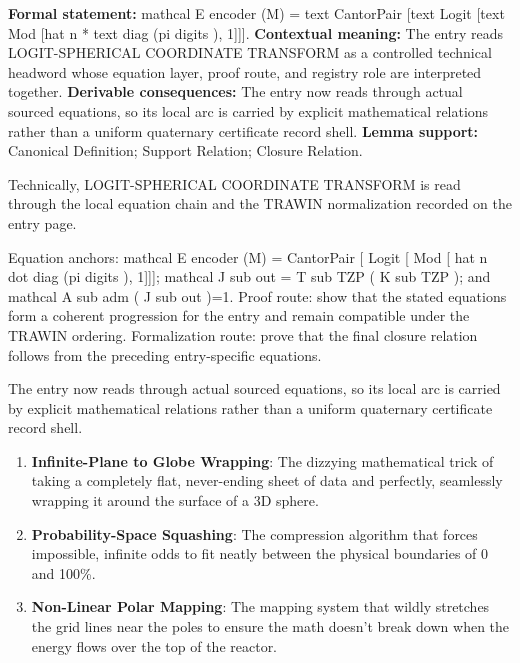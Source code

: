 \begingroup\footnotesize\setlength{\emergencystretch}{3em}\sloppy
\textbf{Formal statement:} mathcal E encoder (M) = text CantorPair [text Logit [text Mod [hat n * text diag (pi digits ), 1]]]. \textbf{Contextual meaning:} The entry reads LOGIT-SPHERICAL COORDINATE TRANSFORM as a controlled technical headword whose equation layer, proof route, and registry role are interpreted together. \textbf{Derivable consequences:} The entry now reads through actual sourced equations, so its local arc is carried by explicit mathematical relations rather than a uniform quaternary certificate record shell. \textbf{Lemma support:} Canonical Definition; Support Relation; Closure Relation.\par
\endgroup

Technically, LOGIT-SPHERICAL COORDINATE TRANSFORM is read through the local equation chain and the TRAWIN normalization recorded on the entry page.

Equation anchors: mathcal E encoder (M) = CantorPair [ Logit [ Mod [ hat n dot diag (pi digits ), 1]]]; mathcal J sub out = T sub TZP ( K sub TZP ); and mathcal A sub adm ( J sub out )=1. Proof route: show that the stated equations form a coherent progression for the entry and remain compatible under the TRAWIN ordering. Formalization route: prove that the final closure relation follows from the preceding entry-specific equations.

The entry now reads through actual sourced equations, so its local arc is carried by explicit mathematical relations rather than a uniform quaternary certificate record shell.
\endgroup

\begin{enumerate}[leftmargin=1.6em,itemsep=6pt,topsep=4pt]
\item \textbf{Infinite-Plane to Globe Wrapping}: The dizzying mathematical trick of taking a completely flat, never-ending sheet of data and perfectly, seamlessly wrapping it around the surface of a 3D sphere.
\item \textbf{Probability-Space Squashing}: The compression algorithm that forces impossible, infinite odds to fit neatly between the physical boundaries of 0 and 100\%.
\item \textbf{Non-Linear Polar Mapping}: The mapping system that wildly stretches the grid lines near the poles to ensure the math doesn't break down when the energy flows over the top of the reactor.
\end{enumerate}

